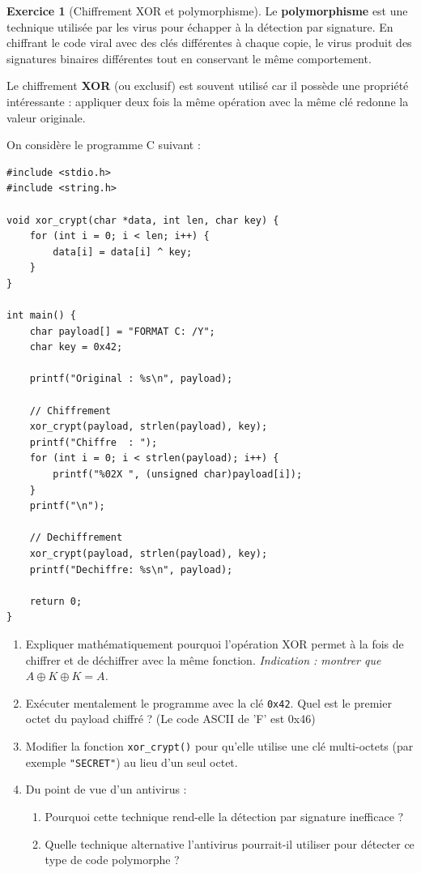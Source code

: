 \documentclass[a4paper,11pt]{article}
\theoremstyle{plain}
\theoremstyle{definition}
\newtheorem{exercice}{Exercice}
\begin{document}
\begin{exercice}[Chiffrement XOR et polymorphisme]

Le \textbf{polymorphisme} est une technique utilisée par les virus pour échapper à la détection par signature. En chiffrant le code viral avec des clés différentes à chaque copie, le virus produit des signatures binaires différentes tout en conservant le même comportement.

Le chiffrement \textbf{XOR} (ou exclusif) est souvent utilisé car il possède une propriété intéressante : appliquer deux fois la même opération avec la même clé redonne la valeur originale.

On considère le programme C suivant :

\begin{verbatim}
#include <stdio.h>
#include <string.h>

void xor_crypt(char *data, int len, char key) {
    for (int i = 0; i < len; i++) {
        data[i] = data[i] ^ key;
    }
}

int main() {
    char payload[] = "FORMAT C: /Y";
    char key = 0x42;

    printf("Original : %s\n", payload);

    // Chiffrement
    xor_crypt(payload, strlen(payload), key);
    printf("Chiffre  : ");
    for (int i = 0; i < strlen(payload); i++) {
        printf("%02X ", (unsigned char)payload[i]);
    }
    printf("\n");

    // Dechiffrement
    xor_crypt(payload, strlen(payload), key);
    printf("Dechiffre: %s\n", payload);

    return 0;
}
\end{verbatim}

\begin{enumerate}
\item Expliquer mathématiquement pourquoi l'opération XOR permet à la fois de chiffrer et de déchiffrer avec la même fonction. \textit{Indication : montrer que $A \oplus K \oplus K = A$.}

\item Exécuter mentalement le programme avec la clé \texttt{0x42}. Quel est le premier octet du payload chiffré ? (Le code ASCII de 'F' est 0x46)

\item Modifier la fonction \texttt{xor\_crypt()} pour qu'elle utilise une clé multi-octets (par exemple \texttt{"SECRET"}) au lieu d'un seul octet.

\item Du point de vue d'un antivirus :
\begin{enumerate}
\item Pourquoi cette technique rend-elle la détection par signature inefficace ?
\item Quelle technique alternative l'antivirus pourrait-il utiliser pour détecter ce type de code polymorphe ?
\end{enumerate}
\end{enumerate}

\end{exercice}
\end{document}
